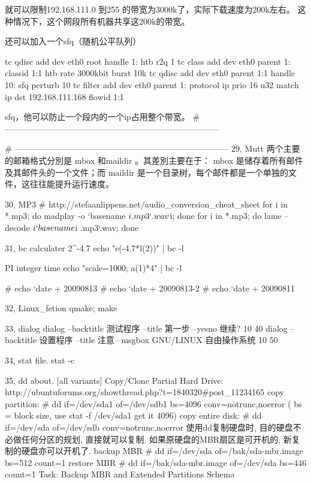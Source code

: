 就可以限制192.168.111.0 到255 的带宽为3000k了，实际下载速度为200k左右。
这种情况下，这个网段所有机器共享这200k的带宽。

 
还可以加入一个sfq（随机公平队列）

tc qdisc add dev eth0 root handle 1: htb r2q 1
tc class add dev eth0 parent 1: classid 1:1 htb rate 3000kbit burst 10k
tc qdisc add dev eth0 parent 1:1 handle 10: sfq perturb 10
tc filter add dev eth0 parent 1: protocol ip prio 16 u32 match ip dst 192.168.111.168 flowid 1:1

sfq，他可以防止一个段内的一个ip占用整个带宽。
# -----------------------------------------------------------------------------

# -----------------------------------------------------------------------------
29, Mutt 
两个主要的邮箱格式分別是 mbox 和maildir 。其差別主要在于： mbox  是储存着所有邮件及其邮件头的一个文件；而 maildir 是一个目录树，每个邮件都是一个单独的文件，这往往能提升运行速度。 

30, MP3
# http://stefaanlippens.net/audio_conversion_cheat_sheet
for i in *.mp3; do madplay -o `basename $i .mp3`.wav $i; done    
for i in *.mp3; do lame --decode $i `basename $i .mp3`.wav; done         

31, bc calculater
2^-4.7
echo "e(-4.7*l(2))" | bc -l

PI integer
time echo "scale=1000; a(1)*4" | bc -l

#  echo `date +%
20090813
#  echo `date +%
20090813-2
#  echo `date +%
20090811 

32, Linux_fetion
qmake; make

33, dialog 
dialog --backtitle 测试程序 --title 第一步 --yesno 继续? 10 40
dialog --backtitle 设置程序 --title 注意 --msgbox GNU/LINUX 自由操作系统 10 50

34, stat file.
stat -c %

35, dd about.
[all variants] Copy/Clone Partial Hard Drive:
http://ubuntuforums.org/showthread.php?t=1840320#post_11234165
copy partition:
# dd if=/dev/sda1 of=/dev/sdb1 bs=4096 conv=notrunc,noerror
( bs = block size, use stat -f /dev/sda1 get it 4096)
copy entire disk:
# dd if=/dev/sda of=/dev/sdb conv=notrunc,noerror
使用dd复制硬盘时, 目的硬盘不必做任何分区的规划, 直接就可以复制. 如果原硬盘的MBR扇区是可开机的, 新复制的硬盘亦可以开机了.
backup MBR
# dd if=/dev/sda of=/bak/sda-mbr.image bs=512 count=1
restore MBR
# dd if=/bak/sda-mbr.image of=/dev/sda bs=446 count=1
Task: Backup MBR and Extended Partitions Schema

